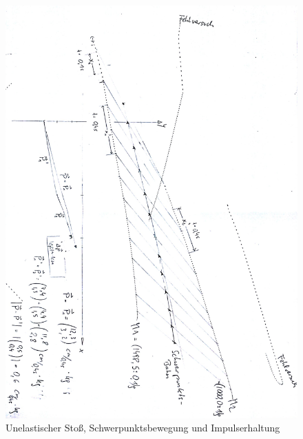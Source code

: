 \documentclass[12pt,a4paper]{article}
\begin{document}
\begin{figure}[H]
	\centering
	\includegraphics[scale=0.75]{./figure/inelastischer_stoss.png}
	\caption{Unelastischer Stoß, Schwerpunktsbewegung und Impulserhaltung}
	\label{fig:inelastisch_stoss}
\end{figure}





\end{document}
